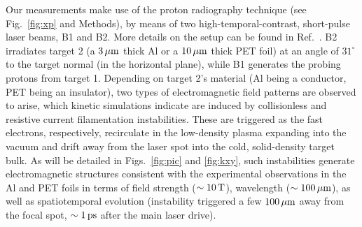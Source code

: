 \documentclass[aps,twocolumn,showpacs,superscriptaddress]{revtex4}
\begin{document}
Our measurements make use of the proton radiography technique (see Fig.~\ref{fig:xp} and Methods), by means of two high-temporal-contrast, short-pulse laser beams, B1 and B2. More details on the setup can be found in Ref.~\cite{RSI_Albertazzi_2015}.
B2 irradiates target 2 (a $3\,\rm \mu m$ thick Al or a $10\,\rm \mu m$ thick PET foil) at an angle of $31^\circ$ to the target normal (in the horizontal plane), while B1 generates the probing protons from target 1. Depending on target 2's material (Al being a conductor, PET being an insulator), two types of electromagnetic field patterns are observed to arise, which kinetic simulations indicate are induced by collisionless and resistive current filamentation instabilities. These are triggered as the fast electrons, respectively, recirculate in the low-density plasma expanding into the vacuum and drift away from the laser spot into the cold, solid-density target bulk. As will be detailed in Figs.~\ref{fig:pic} and \ref{fig:kxy}, such instabilities generate electromagnetic structures consistent with the experimental observations in the Al and PET foils in terms of field strength ($\sim 10\,\rm T$), wavelength ($\sim 100\,\rm \mu m$), as well as spatiotemporal evolution (instability triggered a few $100\,\rm \mu m$ away from the focal spot, $\sim 1\,\rm ps$ after the main laser drive).
%
\end{document}
